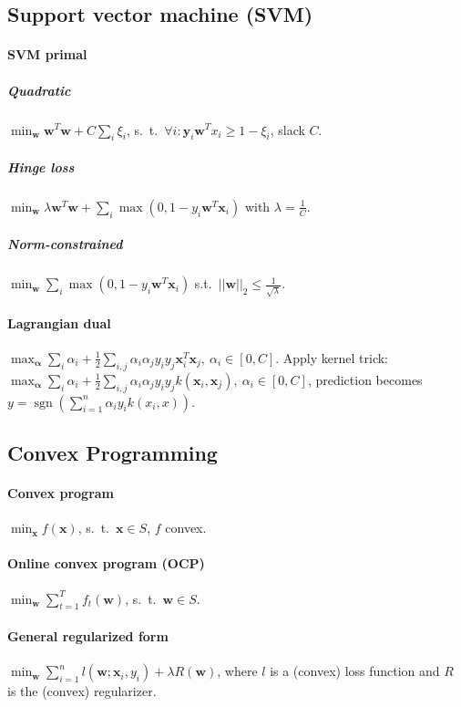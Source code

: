 \documentclass[9pt]{scrartcl}
\DeclareMathOperator{\sign}{sgn}
\begin{document}
\begin{twocolumn}
\subsection{Support vector machine (SVM)}
\paragraph{SVM primal}
\subparagraph{Quadratic} $\min_{\bm w} \bm w^T \bm w + C\sum_{i}\xi_i$,
s.\ t.\ $\forall i: \bm y_i\bm w^T x_i \geq 1 - \xi_i$, slack $C$.
\subparagraph{Hinge loss}
$\min_{\bm w} \lambda \bm w^T \bm w + \sum_{i}\max(0,1-y_i\bm w^T \bm x_i)$ with $\lambda = \frac{1}{C}$.
\subparagraph{Norm-constrained}
$\min_{\bm w} \sum_{i}\max(0,1-y_i\bm w^T\bm x_i)$ s.t.\ $||\bm w||_2 \leq \frac{1}{\sqrt \lambda}$.
\paragraph{Lagrangian dual}
$\max_{\bm \alpha} \sum_{i}\alpha_i + \frac{1}{2}\sum_{i,j}\alpha_i\alpha_j y_i y_j \bm x_i^T\bm x_j,\ \alpha_i \in [0,C]$.
Apply kernel trick: 
$\max_{\bm \alpha} \sum_{i}\alpha_i + \frac{1}{2}\sum_{i,j}\alpha_i\alpha_j y_i y_j k(\bm x_i, \bm x_j),\ \alpha_i \in [0,C]$, prediction becomes $y = \sign(\sum_{i=1}^{n}\alpha_i y_i k(x_i,x))$.

\subsection{Convex Programming}
\paragraph{Convex program} $\min_{\bm x} f(\bm x)$, s.\ t.\ $\bm x \in S$, $f$ convex.
\paragraph{Online convex program (OCP)} $\min_{\bm w} \sum_{t=1}^{T} f_t(\bm w)$, s.\ t.\ $\bm w \in S$.
\paragraph{General regularized form} $\min_{\bm w} \sum_{i=1}^{n} l(\bm w; \bm x_i, y_i) + \lambda R(\bm w)$, where $l$ is a (convex) loss function and $R$ is the (convex) regularizer.

\end{twocolumn}
\end{document}

